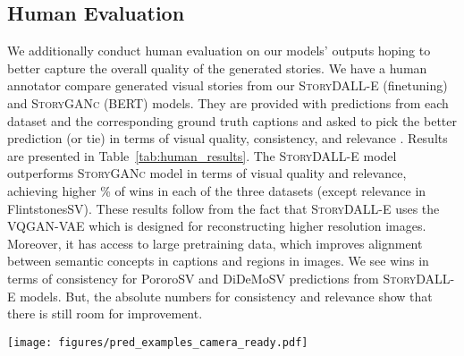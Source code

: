 \documentclass[runningheads]{llncs}
\newcommand{\sdalle}[1]{\textsc{StoryDALL-E}}
\newcommand{\sgan}[1]{\textsc{StoryGANc}}
\begin{document}
\begin{table*}[t]
\centering
\caption{Results from human evaluation (Win\% / Lose\% / Tie\%). Win\% = \% times stories from \sdalle{} was preferred over \sgan{}, Lose\% for vice-versa. Tie\% represents remaining samples.}
\label{tab:human_results}
\end{table*}

\subsection{Human Evaluation}
We additionally conduct human evaluation on our models' outputs hoping to better capture the overall quality of the generated stories. We have a human annotator compare generated visual stories from our \sdalle{} (finetuning) and \sgan{} (BERT) models. They are provided with predictions from each dataset and the corresponding ground truth captions and asked to pick the better prediction (or tie) in terms of visual quality, consistency, and relevance \cite{li2019storygan}. Results are presented in Table~\ref{tab:human_results}. The \sdalle{} model outperforms \sgan{} model in terms of visual quality and relevance, achieving higher \% of wins in each of the three datasets (except relevance in FlintstonesSV). These results follow from the fact that \sdalle{} uses the VQGAN-VAE \cite{esser2021taming} which is designed for reconstructing higher resolution images. Moreover, it has access to large pretraining data, which improves alignment between semantic concepts in captions and regions in images. We see wins in terms of consistency for PororoSV and DiDeMoSV predictions from \sdalle{} models. But, the absolute numbers for consistency and relevance show that there is still room for improvement. 


\begin{figure*}[t]
    \centering
    \texttt{[image: figures/pred\_examples\_camera\_ready.pdf]}
    \caption{Examples of predictions for (A) PororoSV (B) FlintstonesSV and (C) DiDeMoSV story continuation datasets from finetuned \sdalle{} and \sgan{} models. Source frame refers to the initial frame provided as additional input to the model.}
    \label{fig:predictions}
\end{figure*}
\end{document}
